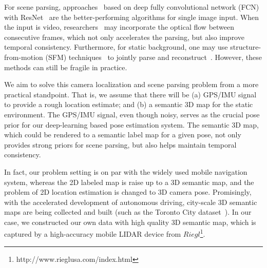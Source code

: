 For scene parsing, approaches~\cite{ZhaoSQWJ16,ChenPSA17} based on deep fully convolutional network (FCN) with ResNet~\cite{HeZRS15} are the better-performing algorithms for single image input. When the input is video, researchers~\cite{kundu2016feature,zhu2016deep} may incorporate the optical flow between consecutive frames, which not only accelerates the parsing, but also improve temporal consistency. Furthermore, for static background, one may use structure-from-motion (SFM) techniques~\cite{wu2011visualsfm} to jointly parse and reconstruct~\cite{kundu2014joint}. However, these methods can still be fragile in practice.

We aim to solve this camera localization and scene parsing problem from a more practical standpoint. That is, we assume that there will be (a) GPS/IMU signal to provide a rough location estimate; and (b) a semantic 3D map for the static environment. The GPS/IMU signal, even though noisy, serves as the crucial pose prior for our deep-learning based pose estimation system. The semantic 3D map, which could be rendered to a semantic label map for a given pose, not only provides strong priors for scene parsing, but also helps maintain temporal consistency. 


%
In fact, our problem setting is on par with the widely used mobile navigation system, whereas the 2D labeled map is raise up to a 3D semantic map, and the problem of 2D location estimation is changed to 3D camera pose. Promisingly, with the accelerated development of autonomous driving, city-scale 3D semantic maps are being collected and built (such as the Toronto City dataset~\cite{wang2016torontocity}).  In our case, we constructed our own data with high quality 3D semantic map, which is captured by a high-accuracy mobile LIDAR device from $Riegl$\footnote{http://www.rieglusa.com/index.html}. 


